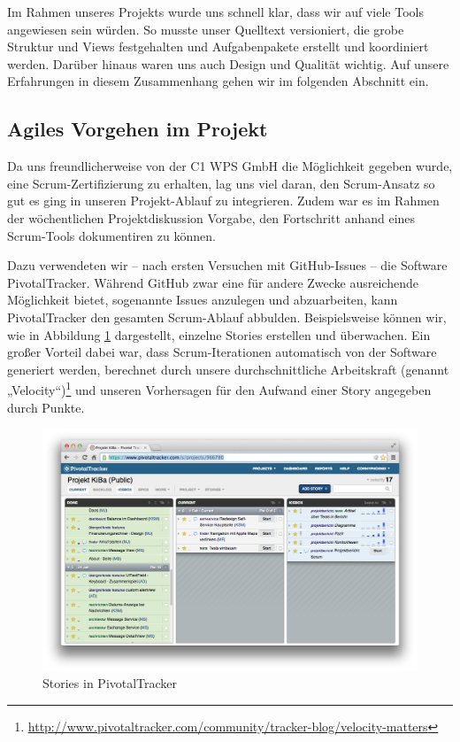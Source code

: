 Im Rahmen unseres Projekts wurde uns schnell klar, dass wir auf viele Tools angewiesen sein würden. So musste unser Quelltext versioniert, die grobe Struktur und Views festgehalten und Aufgabenpakete erstellt und koordiniert werden. Darüber hinaus waren uns auch Design und Qualität wichtig. Auf unsere Erfahrungen in diesem Zusammenhang gehen wir im folgenden Abschnitt ein.

\subsection{Agiles Vorgehen im Projekt}
	Da uns freundlicherweise von der C1 WPS GmbH die Möglichkeit gegeben wurde, eine Scrum-Zer\-ti\-fi\-zie\-rung zu erhalten, lag uns viel daran, den Scrum-Ansatz so gut es ging in unseren Projekt-Ablauf zu integrieren. Zudem war es im Rahmen der wöchentlichen Projektdiskussion Vorgabe, den Fortschritt anhand eines Scrum-Tools dokumentiren zu können.
	
	Dazu verwendeten wir – nach ersten Versuchen mit GitHub-Issues – die Software PivotalTracker. Während GitHub zwar eine für andere Zwecke ausreichende Möglichkeit bietet, sogenannte Issues anzulegen und abzuarbeiten, kann PivotalTracker den gesamten Scrum-Ablauf abbulden.
	Beispielsweise können wir, wie in Abbildung \ref{fig:TrackerStories} dargestellt, einzelne Stories erstellen und überwachen. Ein großer Vorteil dabei war, dass Scrum-Iterationen automatisch von der Software generiert werden, berechnet durch unsere durchschnittliche Arbeitskraft (genannt „Velocity“)\footnote{\url{http://www.pivotaltracker.com/community/tracker-blog/velocity-matters}} und unseren Vorhersagen für den Aufwand einer Story angegeben durch Punkte.
	
\begin{figure}[h!]
	\centering
	\includegraphics[scale=.25]{Pictures/TrackerStories}
	\vspace{-.8cm}
	\caption{Stories in PivotalTracker\label{fig:TrackerStories}}
\end{figure}

